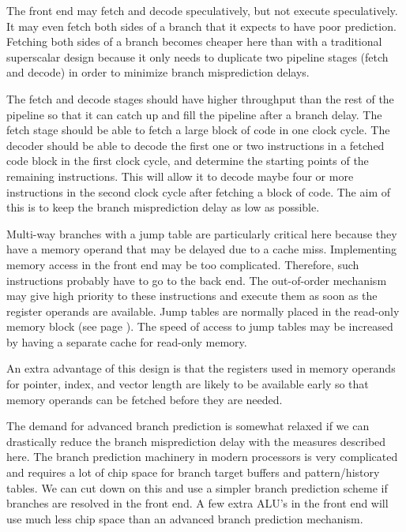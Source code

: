\documentclass[forwardcom.tex]{subfiles}
\begin{document}
The front end may fetch and decode speculatively, but not execute speculatively. It may even fetch both sides of a branch that it expects to have poor prediction. Fetching both sides of a branch becomes cheaper here than with a traditional superscalar design because it only needs to duplicate two pipeline stages (fetch and decode) in order to minimize branch misprediction delays.
\vspace{2mm}

The fetch and decode stages should have higher throughput than the rest of the pipeline so that it can catch up and fill the pipeline after a branch delay. The fetch stage should be able to fetch a large block of code in one clock cycle. The decoder should be able to decode the first one or two instructions in a fetched code block in the first clock cycle, and determine the starting points of the remaining instructions. This will allow it to decode maybe four or more instructions in the second clock cycle after fetching a block of code. The aim of this is to keep the branch misprediction delay as low as possible. 
\vspace{2mm}

Multi-way branches with a jump table are particularly critical here because they have a memory operand that may be delayed due to a cache miss. Implementing memory access in the front end may be too complicated. Therefore, such instructions probably have to go to the back end. The out-of-order mechanism may give high priority to these instructions and execute them as soon as the register operands are available. Jump tables are normally placed in the read-only memory block (see page \pageref{memoryModel}). The speed of access to jump tables may be increased by having a separate cache for read-only memory.
\vspace{2mm}

An extra advantage of this design is that the registers used in memory operands for pointer, index, and vector length are likely to be available early so that memory operands can be fetched before they are needed.
\vspace{2mm}


The demand for advanced branch prediction is somewhat relaxed if we can drastically reduce the branch misprediction delay with the measures described here. The branch prediction machinery in modern processors is very complicated and requires a lot of chip space for branch target buffers and pattern/history tables. We can cut down on this and use a simpler branch prediction scheme if branches are resolved in the front end. A few extra ALU's in the front end will use much less chip space than an advanced branch prediction mechanism. 
\vspace{2mm}
\end{document}
